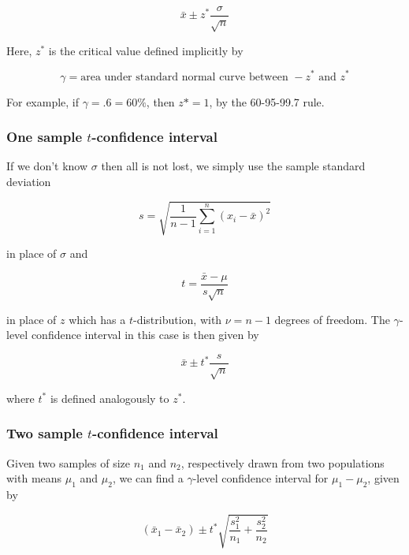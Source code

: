 \documentclass{article}
\newcommand{\xbar}{\bar x}
\begin{document}
\begin{equation}
\boxed{
\xbar \pm z^* \frac{\sigma}{\sqrt{n}}
}
\end{equation}

\noindent
Here, $z^*$ is the critical value defined implicitly by 

\begin{equation}
\gamma = \text{area under standard normal curve between } -z^* \text{ and } z^* 
\end{equation}

\noindent
For example, if $\gamma = .6 = 60\%$, then $z* = 1$, by the 60-95-99.7 rule. 


\subsubsection*{One sample $t$-confidence interval}

If we don't know $\sigma$ then all is not lost, we simply use the sample standard deviation

\begin{equation}
s = \sqrt{ \frac{1}{n - 1} \sum_{i=1}^n (x_i - \xbar)^2}
\end{equation}

\noindent
in place of $\sigma$ and 

\begin{equation}
t = \frac{\xbar - \mu}{s \sqrt{n}} 
\end{equation}

\noindent
in place of $z$ which has a $t$-distribution, with $\nu = n - 1$ degrees of freedom.  The $\gamma$-level confidence interval in this case is then given by

\begin{equation}
\boxed{
\xbar \pm t^* \frac{s}{\sqrt{n}} 
}
\end{equation}

\noindent
where $t^*$ is defined analogously to $z^*$. 


\subsubsection*{Two sample $t$-confidence interval}

Given two samples of size $n_1$ and $n_2$, respectively drawn from two populations with means $\mu_1$ and $\mu_2$, we can find a $\gamma$-level confidence interval for $\mu_1 - \mu_2$, given by 

\begin{equation}
\boxed{
(\xbar_1 - \xbar_2) \pm t^* \sqrt{\frac{s_1^2}{n_1} +\frac{s_2^2}{n_2}} 
}
\end{equation}
\end{document}
